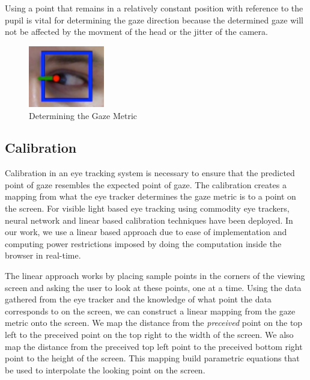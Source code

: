 \documentclass[annual]{acmsiggraph}
\begin{document}
Using a point that remains in a relatively constant position with reference to
the pupil is vital for determining the gaze direction because the determined
gaze will not be affected by the movment of the head or the jitter of the
camera.

\begin{figure}[ht]

    \centering

    \includegraphics[width=1.3in]{figs/gazePrediction.pdf}

    \caption{Determining the Gaze Metric}

\end{figure}



\subsection{Calibration}

Calibration in an eye tracking system is necessary to ensure that the predicted
point of gaze resembles the expected point of gaze. The calibration creates a
mapping from what the eye tracker determines the gaze metric is to a point on
the screen. For visible light based eye tracking using commodity eye trackers,
neural network \cite{holland2012eye} and linear based calibration techniques
have been deployed. In our work, we use a linear based approach due to ease of
implementation and computing power restrictions imposed by doing the
computation inside the browser in real-time.

The linear approach works by placing sample points in the corners of the
viewing screen and asking the user to look at these points, one at a time.
Using the data gathered from the eye tracker and the knowledge of what point
the data corresponds to on the screen, we can construct a linear mapping from
the gaze metric onto the screen. We map the distance from the \emph{preceived}
point on the top left to the preceived point on the top right to the width of
the screen. We also map the distance from the preceived top left point to the
preceived bottom right point to the height of the screen. This mapping build
parametric equations that be used to interpolate the looking point on the
screen.
\end{document}

